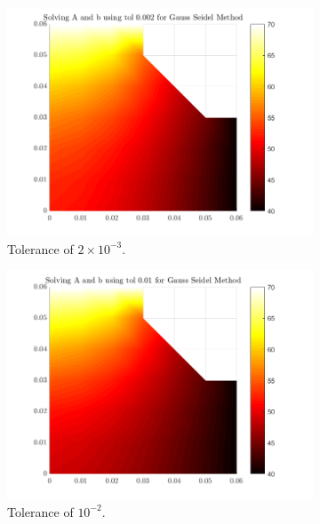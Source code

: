 \documentclass[12pt,a4paper]{article}
\begin{document}
\begin{figure}[H]
\begin{subfigure}[b]{0.48\textwidth}
		\includegraphics[width=\linewidth]{images/GaussComparisontol0-002.png}
		\caption{Tolerance of $2 \times 10^{-3}$.}
		\label{fig:Gausstol0.002}
	\end{subfigure}
	\hfill
	\begin{subfigure}[b]{0.48\textwidth}
		\centering
		\includegraphics[width=\linewidth]{images/GaussComparisontol0-01.png}
		\caption{Tolerance of $10^{-2}$.}
		\label{fig:Gausstol0.01}
	\end{subfigure}
	\hfill
	\begin{subfigure}[b]{0.48\textwidth}
		\centering

\end{subfigure}
\end{figure}
\end{document}

